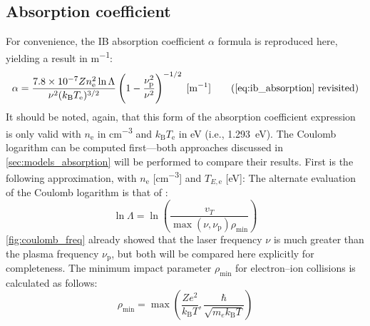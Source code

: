         \subsection{Absorption coefficient}
            For convenience, the IB absorption coefficient $\alpha$ formula is reproduced here, yielding a result in \unit{m^{-1}}:
            \begin{equation*}
                \ibalphaeq \tag{\ref{eq:ib_absorption} revisited}
            \end{equation*}
            It should be noted, again, that this form of the absorption coefficient expression is only valid with $n_\mathrm{e}$ in \unit{cm^{-3}} and $k_\mathrm{B}T_\mathrm{e}$ in \unit{eV} (i.e., \qty{1.293}{eV}). The Coulomb logarithm can be computed first---both approaches discussed in \autoref{sec:models_absorption} will be performed to compare their results. First is the following approximation, with $n_\mathrm{e}$ [\unit{cm^{-3}}] and $T_{E,\mathrm{e}}$ [eV]:
            The alternate evaluation of the Coulomb logarithm is that of \textcite{johnstonCorrectValuesHighfrequency1973}:
            \begin{equation*}
                \ln{\Lambda} = \ln{\left(\frac{v_T}{\max{(\nu, \nu_\mathrm{p})}\rho_\mathrm{min}}\right)}
            \end{equation*}
            \autoref{fig:coulomb_freq} already showed that the laser frequency $\nu$ is much greater than the plasma frequency $\nu_\mathrm{p}$, but both will be compared here explicitly for completeness.
            The minimum impact parameter $\rho_\mathrm{min}$ for electron--ion collisions is calculated as follows:
            \begin{equation*}
                \rho_\mathrm{min} = \max{\left(\frac{Ze^2}{k_\mathrm{B}T}, \frac{\hbar}{\sqrt{m_ek_\mathrm{B}T}}\right)}
            \end{equation*}
